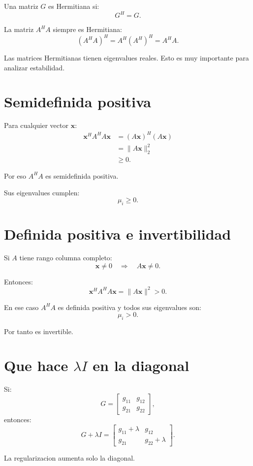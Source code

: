 \documentclass[11pt]{article}
\begin{document}
Una matriz \(G\) es Hermitiana si:
\[
    G^H = G.
\]

La matriz \(A^H A\) siempre es Hermitiana:
\[
    (A^H A)^H = A^H (A^H)^H = A^H A.
\]

Las matrices Hermitianas tienen eigenvalues reales. Esto es muy importante
para analizar estabilidad.

\section{Semidefinida positiva}

Para cualquier vector \(\bm x\):
\[
\begin{aligned}
    \bm x^H A^H A \bm x
    &=
    (A\bm x)^H(A\bm x)\\
    &=
    \|A\bm x\|_2^2\\
    &\ge 0.
\end{aligned}
\]

Por eso \(A^H A\) es semidefinida positiva.

Sus eigenvalues cumplen:
\[
    \mu_i \ge 0.
\]

\section{Definida positiva e invertibilidad}

Si \(A\) tiene rango columna completo:
\[
    \bm x \ne 0
    \quad \Rightarrow \quad
    A\bm x \ne 0.
\]

Entonces:
\[
    \bm x^H A^H A\bm x = \|A\bm x\|^2 > 0.
\]

En ese caso \(A^H A\) es definida positiva y todos sus eigenvalues son:
\[
    \mu_i > 0.
\]

Por tanto es invertible.

\section{Que hace \(\lambda I\) en la diagonal}

Si:
\[
G =
\begin{bmatrix}
g_{11} & g_{12}\\
g_{21} & g_{22}
\end{bmatrix},
\]
entonces:
\[
G+\lambda I =
\begin{bmatrix}
g_{11}+\lambda & g_{12}\\
g_{21} & g_{22}+\lambda
\end{bmatrix}.
\]

La regularizacion aumenta solo la diagonal.
\end{document}
